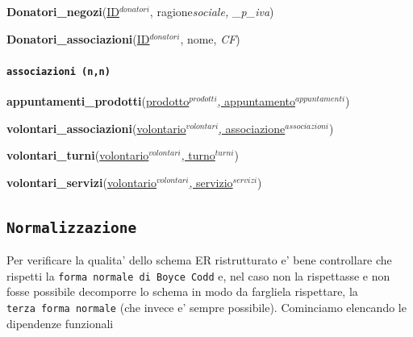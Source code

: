 \documentclass[]{article}
\let\oldparagraph\paragraph
\renewcommand{\paragraph}[1]{\oldparagraph{#1}\mbox{}}
\begin{document}
\textbf{Donatori\_negozi}(\underline{ID$^{donatori}$},
ragione\emph{sociale, \_p\_iva})

\textbf{Donatori\_associazioni}(\underline{ID$^{donatori}$}, nome,
\emph{CF})

\hypertarget{associazioni-nn}{%
\paragraph{\texorpdfstring{\texttt{associazioni\ (n,n)}}{associazioni (n,n)}}\label{associazioni-nn}}

\textbf{appuntamenti\_prodotti}(\underline{prodotto$^{prodotti}$, appuntamento$^{appuntamenti}$})

\textbf{volontari\_associazioni}(\underline{volontario$^{volontari}$, associazione$^{associazioni}$})

\textbf{volontari\_turni}(\underline{volontario$^{volontari}$, turno$^{turni}$})

\textbf{volontari\_servizi}(\underline{volontario$^{volontari}$, servizio$^{servizi}$})

\hypertarget{normalizzazione}{%
\subsection{\texorpdfstring{\texttt{Normalizzazione}}{Normalizzazione}}\label{normalizzazione}}

Per verificare la qualita' dello schema ER ristrutturato e' bene
controllare che rispetti la \texttt{forma\ normale\ di\ Boyce\ Codd} e,
nel caso non la rispettasse e non fosse possibile decomporre lo schema
in modo da fargliela rispettare, la \texttt{terza\ forma\ normale} (che
invece e' sempre possibile). Cominciamo elencando le dipendenze
funzionali
\end{document}
